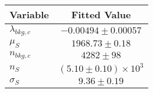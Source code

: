 \begin{tabular}[t]{lc}
\hline
Variable &Fitted Value\\
\hline\hline
$\lambda_{bkg,c}$&$-0.00494\pm0.00057$\\
\hline
$\mu_{S}$&$1968.73\pm0.18$\\
\hline
$n_{bkg,c}$&$4282\pm98$\\
\hline
$n_{S}$&$(5.10\pm0.10)\times 10^3$\\
\hline
$\sigma_{S}$&$9.36\pm0.19$\\
\hline
\end{tabular}